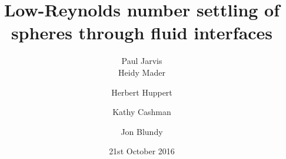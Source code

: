 \documentclass{beamer}
\title[Sinking Spheres]{Low-Reynolds number settling of spheres through fluid interfaces} %
\author[Paul Jarvis]{Paul Jarvis\inst{1,2} \\ \medskip \small Heidy Mader\inst{1} \and Herbert Huppert\inst{1,2} \and Kathy Cashman\inst{1} \and Jon Blundy\inst{1}} %
\institute[UoB] %
{
\inst{1}%
  School of Earth Sciences\\
  University of Bristol
  \and
  \inst{2}%
  Department of Applied Mathematics and Theoretical Physics\\
  University of Cambridge
 \\ %
\medskip
\textit{paj35@cam.ac.uk} %
}
\date{21st October 2016} %
\begin{document}
\begin{frame}
\titlepage %
\end{frame}




\end{document}

